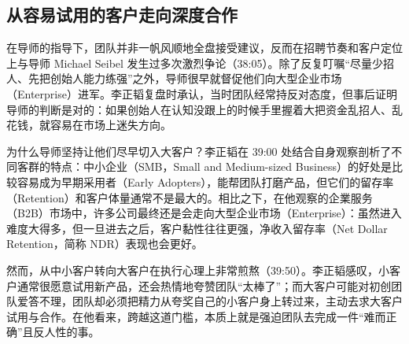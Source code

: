 \documentclass[UTF8,a4paper,11pt,fontset=fandol]{ctexart}
\begin{document}
\subsection{从容易试用的客户走向深度合作}
在导师的指导下，团队并非一帆风顺地全盘接受建议，反而在招聘节奏和客户定位上与导师 Michael Seibel 发生过多次激烈争论（38:05）。除了反复叮嘱“尽量少招人、先把创始人能力练强”之外，导师很早就督促他们向大型企业市场（Enterprise）进军。李正韬复盘时承认，当时团队经常持反对态度，但事后证明导师的判断是对的：如果创始人在认知没跟上的时候手里握着大把资金乱招人、乱花钱，就容易在市场上迷失方向。

为什么导师坚持让他们尽早切入大客户？李正韬在 39:00 处结合自身观察剖析了不同客群的特点：中小企业（SMB，Small and Medium-sized Business）的好处是比较容易成为早期采用者（Early Adopters），能帮团队打磨产品，但它们的留存率（Retention）和客户体量通常不是最大的。相比之下，在他观察的企業服务（B2B）市场中，许多公司最终还是会走向大型企业市场（Enterprise）：虽然进入难度大得多，但一旦进去之后，客户黏性往往更强，净收入留存率（Net Dollar Retention，简称 NDR）表现也会更好。

然而，从中小客户转向大客户在执行心理上非常煎熬（39:50）。李正韬感叹，小客户通常很愿意试用新产品，还会热情地夸赞团队“太棒了”；而大客户可能对初创团队爱答不理，团队却必须把精力从夸奖自己的小客户身上转过来，主动去求大客户试用与合作。在他看来，跨越这道门槛，本质上就是强迫团队去完成一件“难而正确”且反人性的事。
\end{document}
